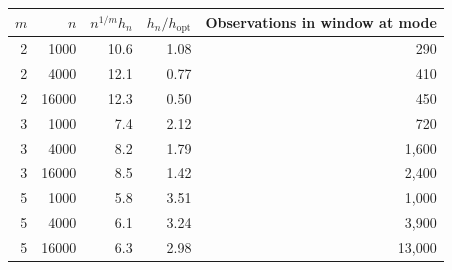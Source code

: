 \begin{tabular}{rrrrr}
\toprule
$m$ & $n$ & $n^{1/m}h_n$ & $h_n/h_{\text{opt}}$ & Observations in window at mode \\
\midrule
2 & 1000 & 10.6 & 1.08 & 290 \\
2 & 4000 & 12.1 & 0.77 & 410 \\
2 & 16000 & 12.3 & 0.50 & 450 \\
3 & 1000 & 7.4 & 2.12 & 720 \\
3 & 4000 & 8.2 & 1.79 & 1,600 \\
3 & 16000 & 8.5 & 1.42 & 2,400 \\
5 & 1000 & 5.8 & 3.51 & 1,000 \\
5 & 4000 & 6.1 & 3.24 & 3,900 \\
5 & 16000 & 6.3 & 2.98 & 13,000 \\
\bottomrule
\end{tabular}
